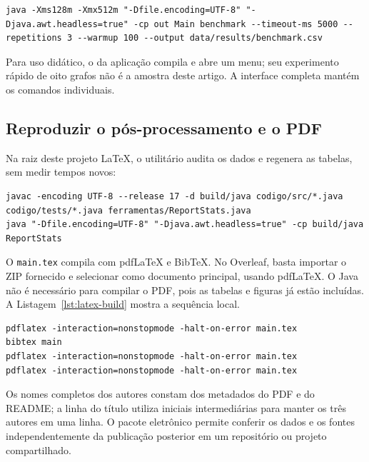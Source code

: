 \begin{lstlisting}[language={},numbers=none,basicstyle=\ttfamily\footnotesize,caption={Configuração do benchmark original, com três medições por algoritmo e instância.},label={lst:benchmark-command}]
java -Xms128m -Xmx512m "-Dfile.encoding=UTF-8" "-Djava.awt.headless=true" -cp out Main benchmark --timeout-ms 5000 --repetitions 3 --warmup 100 --output data/results/benchmark.csv
\end{lstlisting}

Para uso didático, o  da aplicação
compila e abre um menu; seu experimento rápido de
oito grafos não é a amostra deste artigo.
A interface completa mantém os comandos individuais.

\subsection{Reproduzir o pós-processamento e o PDF}

Na raiz deste projeto LaTeX, o utilitário
 audita os dados e
regenera as tabelas, sem medir tempos novos:

\begin{lstlisting}[language={},numbers=none,basicstyle=\ttfamily\footnotesize,caption={Pós-processamento separado da aplicação experimental.},label={lst:postprocess}]
javac -encoding UTF-8 --release 17 -d build/java codigo/src/*.java codigo/tests/*.java ferramentas/ReportStats.java
java "-Dfile.encoding=UTF-8" "-Djava.awt.headless=true" -cp build/java ReportStats
\end{lstlisting}

O \texttt{main.tex} compila com pdfLaTeX e BibTeX.
No Overleaf, basta importar o ZIP fornecido e selecionar
 como documento principal, usando
pdfLaTeX. O Java não é necessário para compilar o PDF,
pois as tabelas e figuras já estão incluídas. A
Listagem~\ref{lst:latex-build} mostra a sequência local.

\begin{lstlisting}[language={},numbers=none,basicstyle=\ttfamily\footnotesize,caption={Compilação local do artigo e resolução de referências cruzadas.},label={lst:latex-build}]
pdflatex -interaction=nonstopmode -halt-on-error main.tex
bibtex main
pdflatex -interaction=nonstopmode -halt-on-error main.tex
pdflatex -interaction=nonstopmode -halt-on-error main.tex
\end{lstlisting}

Os nomes completos dos autores constam dos metadados do
PDF e do README; a linha do título utiliza iniciais
intermediárias para manter os três autores em uma linha.
O pacote eletrônico permite conferir os dados e os
fontes independentemente da publicação posterior em um
repositório ou projeto compartilhado.
